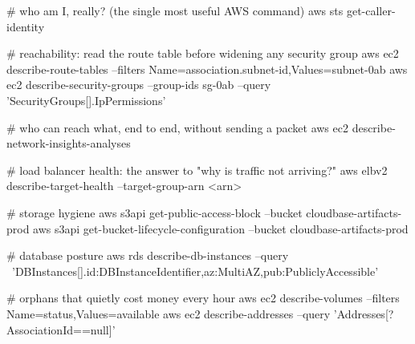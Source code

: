 \begin{cheatsheet}
\end{cheatsheet}

\begin{bashbox}
# who am I, really? (the single most useful AWS command)
aws sts get-caller-identity

# reachability: read the route table before widening any security group
aws ec2 describe-route-tables --filters Name=association.subnet-id,Values=subnet-0ab
aws ec2 describe-security-groups --group-ids sg-0ab --query 'SecurityGroups[].IpPermissions'

# who can reach what, end to end, without sending a packet
aws ec2 describe-network-insights-analyses

# load balancer health: the answer to "why is traffic not arriving?"
aws elbv2 describe-target-health --target-group-arn <arn>

# storage hygiene
aws s3api get-public-access-block --bucket cloudbase-artifacts-prod
aws s3api get-bucket-lifecycle-configuration --bucket cloudbase-artifacts-prod

# database posture
aws rds describe-db-instances --query \
  'DBInstances[].{id:DBInstanceIdentifier,az:MultiAZ,pub:PubliclyAccessible}'

# orphans that quietly cost money every hour
aws ec2 describe-volumes --filters Name=status,Values=available
aws ec2 describe-addresses --query 'Addresses[?AssociationId==null]'
\end{bashbox}


